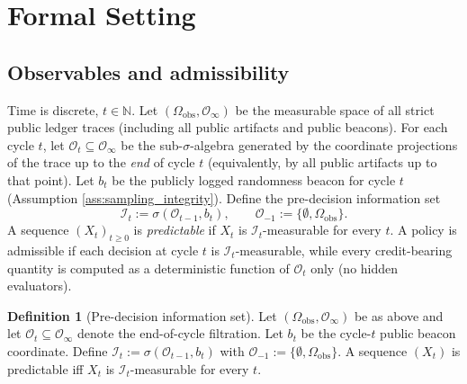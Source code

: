 \documentclass[11pt,a4paper]{article}
\newcommand{\N}{\mathbb{N}}
\newcommand{\Omegaobs}{\Omega_{\mathrm{obs}}}
\newcommand{\cI}{\mathcal{I}}
\newcommand{\cO}{\mathcal{O}}
\theoremstyle{definition}
\newtheorem{definition}{Definition}
\theoremstyle{remark}
\begin{document}
\section{Formal Setting}
\subsection{Observables and admissibility}
Time is discrete, $t\in\N$.
Let $(\Omegaobs,\cO_\infty)$ be the measurable space of all strict public ledger traces (including all public artifacts and public beacons).
For each cycle $t$, let $\cO_t\subseteq\cO_\infty$ be the sub-$\sigma$-algebra generated by the coordinate projections of the trace up to the \emph{end} of cycle $t$ (equivalently, by all public artifacts up to that point).
Let $b_t$ be the publicly logged randomness beacon for cycle $t$ (Assumption \ref{ass:sampling_integrity}).
Define the pre-decision information set
\[
\cI_t:=\sigma(\cO_{t-1},b_t),\qquad \cO_{-1}:=\{\emptyset,\Omegaobs\}.
\]
A sequence $(X_t)_{t\ge 0}$ is \emph{predictable} if $X_t$ is $\cI_t$-measurable for every $t$.
A policy is admissible if each decision at cycle $t$ is $\cI_t$-measurable, while every credit-bearing quantity is computed as a deterministic function of $\cO_t$ only (no hidden evaluators).


\begin{definition}[Pre-decision information set]\label{def:predecision_information}
Let $(\Omegaobs,\cO_\infty)$ be as above and let $\cO_t\subseteq\cO_\infty$ denote the end-of-cycle filtration. Let $b_t$ be the cycle-$t$ public beacon coordinate.
Define $\cI_t:=\sigma(\cO_{t-1},b_t)$ with $\cO_{-1}:=\{\emptyset,\Omegaobs\}$.
A sequence $(X_t)$ is predictable iff $X_t$ is $\cI_t$-measurable for every $t$.
\end{definition}
\end{document}
